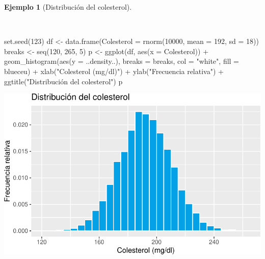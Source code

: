 \documentclass[
  a4paper,
]{scrreport}
\newenvironment{Shaded}{\begin{snugshade}}{\end{snugshade}}
\newcommand{\AttributeTok}[1]{\textcolor[rgb]{0.40,0.45,0.13}{#1}}
\newcommand{\DecValTok}[1]{\textcolor[rgb]{0.68,0.00,0.00}{#1}}
\newcommand{\FunctionTok}[1]{\textcolor[rgb]{0.28,0.35,0.67}{#1}}
\newcommand{\NormalTok}[1]{\textcolor[rgb]{0.00,0.23,0.31}{#1}}
\newcommand{\OtherTok}[1]{\textcolor[rgb]{0.00,0.23,0.31}{#1}}
\newcommand{\SpecialCharTok}[1]{\textcolor[rgb]{0.37,0.37,0.37}{#1}}
\newcommand{\StringTok}[1]{\textcolor[rgb]{0.13,0.47,0.30}{#1}}
\theoremstyle{plain}
\theoremstyle{definition}
\theoremstyle{definition}
\newtheorem{example}{Ejemplo}[chapter]
\theoremstyle{remark}
\begin{document}
\begin{example}[Distribución del
colesterol]\protect\hypertarget{exm-distribucion-colesterol}{}\label{exm-distribucion-colesterol}

~

\begin{Shaded}
\begin{Highlighting}[]
\FunctionTok{set.seed}\NormalTok{(}\DecValTok{123}\NormalTok{)}
\NormalTok{df }\OtherTok{\textless{}{-}} \FunctionTok{data.frame}\NormalTok{(}\AttributeTok{Colesterol =} \FunctionTok{rnorm}\NormalTok{(}\DecValTok{10000}\NormalTok{, }\AttributeTok{mean =} \DecValTok{192}\NormalTok{, }\AttributeTok{sd =} \DecValTok{18}\NormalTok{))}
\NormalTok{breaks }\OtherTok{\textless{}{-}} \FunctionTok{seq}\NormalTok{(}\DecValTok{120}\NormalTok{, }\DecValTok{265}\NormalTok{, }\DecValTok{5}\NormalTok{)}
\NormalTok{p }\OtherTok{\textless{}{-}} \FunctionTok{ggplot}\NormalTok{(df, }\FunctionTok{aes}\NormalTok{(}\AttributeTok{x =}\NormalTok{ Colesterol)) }\SpecialCharTok{+}
    \FunctionTok{geom\_histogram}\NormalTok{(}\FunctionTok{aes}\NormalTok{(}\AttributeTok{y =}\NormalTok{ ..density..), }\AttributeTok{breaks =}\NormalTok{ breaks, }\AttributeTok{col =} \StringTok{"white"}\NormalTok{, }\AttributeTok{fill =}\NormalTok{ blueceu) }\SpecialCharTok{+}
    \FunctionTok{xlab}\NormalTok{(}\StringTok{"Colesterol (mg/dl)"}\NormalTok{) }\SpecialCharTok{+}
    \FunctionTok{ylab}\NormalTok{(}\StringTok{"Frecuencia relativa"}\NormalTok{) }\SpecialCharTok{+}
    \FunctionTok{ggtitle}\NormalTok{(}\StringTok{"Distribución del colesterol"}\NormalTok{)}
\NormalTok{p}
\end{Highlighting}
\end{Shaded}

\includegraphics{02-estadistica-descriptiva_files/figure-pdf/histograma-colesterol-1.pdf}

\end{example}
\end{document}
